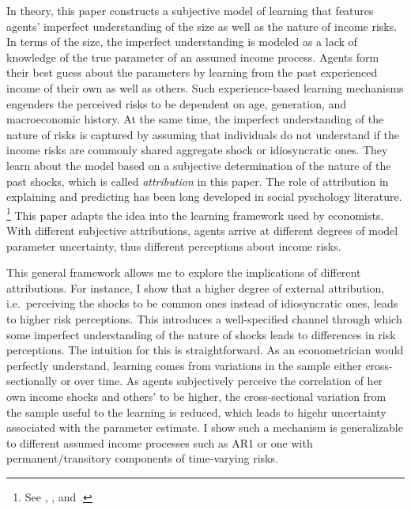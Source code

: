 \documentclass[12pt,notitlepage,onecolumn,aps,pra]{article}
\begin{document}
In theory, this paper constructs a subjective model of learning that
features agents' imperfect understanding of the size as well as the
nature of income risks. In terms of the size, the imperfect
understanding is modeled as a lack of knowledge of the true parameter of
an assumed income process. Agents form their best guess about the
parameters by learning from the past experienced income of their own as
well as others. Such experience-based learning mechanisms engenders the
perceived risks to be dependent on age, generation, and macroeconomic
history. At the same time, the imperfect understanding of the nature of
risks is captured by assuming that individuals do not understand if the
income risks are commonly shared aggregate shock or idiosyncratic ones.
They learn about the model based on a subjective determination of the
nature of the past shocks, which is called \emph{attribution} in this
paper. The role of attribution in explaining and predicting has been
long developed in social pyschology literature.
\footnote{See \cite{heider1958psychology}, \cite{kelley1967attribution}, and \cite{fiske1991social}.}
This paper adapts the idea into the learning framework used by
economists. With different subjective attributions, agents arrive at
different degrees of model parameter uncertainty, thus different
perceptions about income risks.

This general framework allows me to explore the implications of
different attributions. For instance, I show that a higher degree of
external attribution, i.e.~perceiving the shocks to be common ones
instead of idiosyncratic ones, leads to higher risk perceptions. This
introduces a well-specified channel through which some imperfect
understanding of the nature of shocks leads to differences in risk
perceptions. The intuition for this is straightforward. As an
econometrician would perfectly understand, learning comes from
variations in the sample either cross-sectionally or over time. As
agents subjectively perceive the correlation of her own income shocks
and others' to be higher, the cross-sectional variation from the sample
useful to the learning is reduced, which leads to higehr uncertainty
associated with the parameter estimate. I show such a mechanism is
generalizable to different assumed income processes such as AR1 or one
with permanent/transitory components of time-varying risks.
\end{document}
